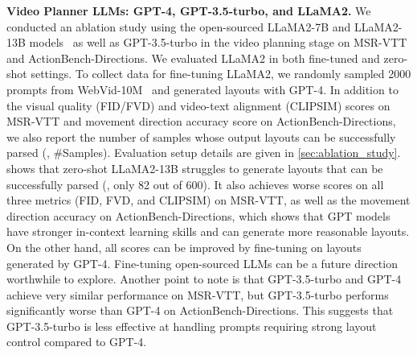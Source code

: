 \documentclass{article}
\begin{document}
\begin{table}[t]
    \centering
    \caption{Ablation of the denoising steps with layout guidance (via guided 2D attentions) in MSR-VTT and ActionBench-Direction prompts, where
    $\alpha=\frac{\text{\# steps with layout guidance}}{\text{\# total steps}}$.
    }
    \label{tab:ablation_alpha}
\end{table}



\noindent\textbf{Video Planner LLMs: GPT-4, GPT-3.5-turbo, and LLaMA2.}
We conducted an ablation study using the open-sourced LLaMA2-7B and LLaMA2-13B models~\citep{touvron2023llama} as well as GPT-3.5-turbo in the video planning stage on MSR-VTT and ActionBench-Directions. 
We evaluated LLaMA2 in both fine-tuned and zero-shot settings. To collect data for fine-tuning LLaMA2, we randomly sampled 2000 prompts from WebVid-10M~\citep{bain2021frozen} and generated layouts with GPT-4. In addition to the visual quality (FID/FVD) and video-text alignment (CLIPSIM) scores on MSR-VTT and movement direction accuracy score on ActionBench-Directions, we also report the number of samples whose output layouts can be successfully parsed (\eg, \#Samples). Evaluation setup details are given in \cref{sec:ablation_study}.
 shows that zero-shot LLaMA2-13B struggles to generate layouts that can be successfully parsed (\eg, only 82 out of 600). It also achieves worse scores on all three metrics (FID, FVD, and CLIPSIM) on MSR-VTT, as well as the movement direction accuracy on ActionBench-Directions, which shows that GPT models have stronger in-context learning skills and can generate more reasonable layouts.
On the other hand, all scores can be improved by fine-tuning on layouts generated by GPT-4.
Fine-tuning open-sourced LLMs can be a future direction worthwhile to explore.
Another point to note is that GPT-3.5-turbo and GPT-4 achieve very similar performance on MSR-VTT, but GPT-3.5-turbo performs significantly worse than GPT-4 on ActionBench-Directions. This suggests that GPT-3.5-turbo is less effective at handling prompts requiring strong layout control compared to GPT-4.
\end{document}
